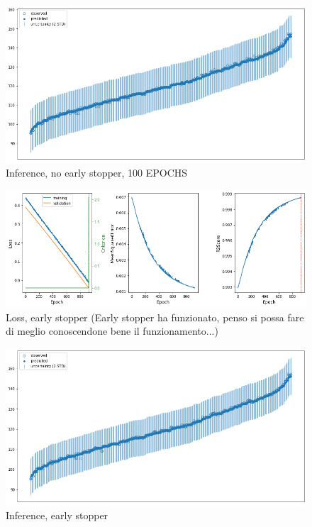 \newpage

\begin{figure}[h]
    \centering
    \includegraphics[width=1\textwidth]{images/Training - temp/SBP - inference.png}
    \caption{Inference, no early stopper, 100 EPOCHS}
\end{figure}


\newpage

\begin{figure}[h]
    \centering
    \includegraphics[width=1\textwidth]{images/Training - temp/SBP - loss - early stopper.png}
    \caption{Loss, early stopper (Early stopper ha funzionato, penso si possa fare di meglio conoscendone bene il funzionamento...)}
\end{figure}


\newpage

\begin{figure}[h]
    \centering
    \includegraphics[width=1\textwidth]{images/Training - temp/SBP - inference - early stopper.png}
    \caption{Inference, early stopper}
\end{figure}

